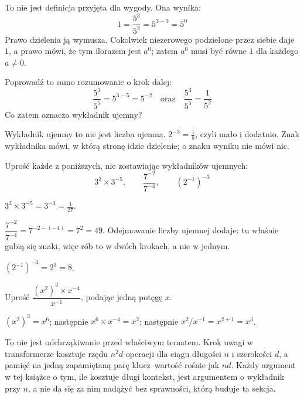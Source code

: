 \begin{fr}
To nie jest definicja przyjęta dla wygody. Ona wynika:
\[ 1 = \frac{5^{3}}{5^{3}} = 5^{3-3} = 5^{0} \]
Prawo dzielenia ją wymusza. Cokolwiek niezerowego podzielone przez siebie daje
$1$, a prawo mówi, że tym ilorazem jest $a^{0}$; zatem $a^{0}$ musi być równe
$1$ dla każdego $a \ne 0$.

Poprowadź to samo rozumowanie o krok dalej:
\[ \frac{5^{3}}{5^{5}} = 5^{3-5} = 5^{-2} \quad\text{oraz}\quad
   \frac{5^{3}}{5^{5}} = \frac{1}{5^{2}} \]
Co zatem oznacza wykładnik ujemny?
\nextframe
\end{fr}

\begin{fr}
Wykładnik ujemny to nie jest liczba ujemna. $2^{-3} = \tfrac{1}{8}$, czyli mało
i dodatnio. Znak wykładnika mówi, w którą stronę idzie dzielenie; o znaku
wyniku nie mówi nic.

Uprość każde z poniższych, nie zostawiając wykładników ujemnych:
\[ 3^{2} \times 3^{-5}, \qquad \frac{7^{-2}}{7^{-4}}, \qquad (2^{-1})^{-3} \]
\dotline
\nextframe
\end{fr}

\begin{fr}
\begin{ansblock}
$3^{2} \times 3^{-5} = 3^{-3} = \tfrac{1}{27}$.

$\dfrac{7^{-2}}{7^{-4}} = 7^{-2-(-4)} = 7^{2} = 49$. Odejmowanie liczby ujemnej
dodaje; tu właśnie gubią się znaki, więc rób to w dwóch krokach, a nie w
jednym.

$(2^{-1})^{-3} = 2^{3} = 8$.
\end{ansblock}

\yourturn
Uprość $\dfrac{(x^{2})^{3} \times x^{-4}}{x^{-1}}$, podając jedną potęgę $x$.
\dotline
\nextframe
\end{fr}

\begin{fr}
\begin{ansblock}
$(x^{2})^{3} = x^{6}$; następnie $x^{6} \times x^{-4} = x^{2}$; następnie
$x^{2}/x^{-1} = x^{2+1} = x^{3}$.
\end{ansblock}

\begin{aibox}
To nie jest odchrząkiwanie przed właściwym tematem. Krok uwagi w transformerze
kosztuje rzędu $n^{2}d$ operacji dla ciągu długości $n$ i szerokości $d$, a
pamięć na jedną zapamiętaną parę klucz--wartość rośnie jak $n d$. Każdy
argument w tej książce o tym, ile kosztuje długi kontekst, jest argumentem o
wykładnik przy $n$, a nie da się za nim nadążyć bez sprawności, którą buduje ta
sekcja.
\end{aibox}
\end{fr}

